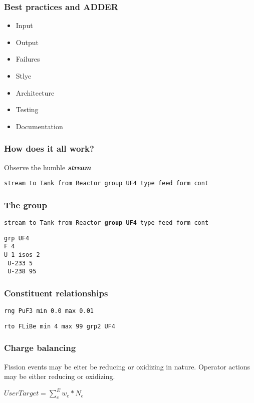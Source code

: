 \documentclass{beamer}
\begin{document}
\begin{frame}
\frametitle{Best practices and ADDER}

    \begin{itemize}
        \item Input
        \item Output
        \item Failures
        \item Stlye
        \item Architecture
        \item Testing
        \item Documentation
    \end{itemize}

\end{frame}

\begin{frame}
\frametitle{How does it all work?}

Observe the humble \textbf{\textit{stream}}

\hspace{2cm}

\small{\texttt{stream to Tank from Reactor group UF4 type feed form cont}}

\end{frame}

\begin{frame}
\frametitle{The group}

\small{\texttt{stream to Tank from Reactor \textbf{group UF4} type feed form cont}}

\hspace{2cm}

\texttt{grp UF4}\\
\texttt{F   4}\\
\texttt{U   1   isos    2}\\
\texttt{    U-233    5}\\
\texttt{    U-238   95}

\end{frame}

\begin{frame}
\frametitle{Constituent relationships}

\texttt{rng PuF3    min 0.0 max 0.01}

\hspace{2cm}

\texttt{rto FLiBe   min 4   max 99  grp2    UF4}

\end{frame}

\begin{frame}
\frametitle{Charge balancing}

Fission events may be eiter be reducing or oxidizing in nature. Operator
actions may be either reducing or oxidizing.

\hspace{2cm}

$UserTarget = \sum\limits_{e}^{E}w_{e}*N_{e}$

\end{frame}
\end{document}
